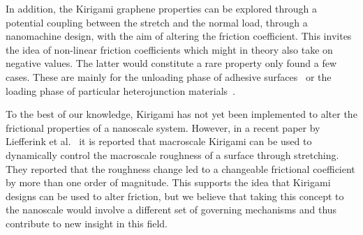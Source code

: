 In addition, the Kirigami graphene properties can be explored through a
potential coupling between the stretch and the normal load, through a
nanomachine design, with the aim of altering the friction coefficient. This
invites the idea of non-linear friction coefficients which might in theory also
take on negative values. The latter would constitute a rare property only found a few cases. These are mainly for the unloading phase of adhesive surfaces~\cite{deng_adhesion-dependent_2012} or the loading phase of particular heterojunction materials~\cite{Liu_2020, Mandelli_2019}.

To the best of our knowledge, Kirigami has not yet been implemented to alter the
frictional properties of a nanoscale system. However, in a recent paper by
Liefferink et al.~\cite{LIEFFERINK2021101475} it is reported that macroscale
Kirigami can be used to dynamically control the macroscale roughness of a
surface through stretching. They reported that the roughness change led to a
changeable frictional coefficient by more than one order of magnitude. This
supports the idea that Kirigami designs can be used to alter friction, but we
believe that taking this concept to the nanoscale would involve a different set of governing mechanisms and thus contribute to new insight in
this field.











